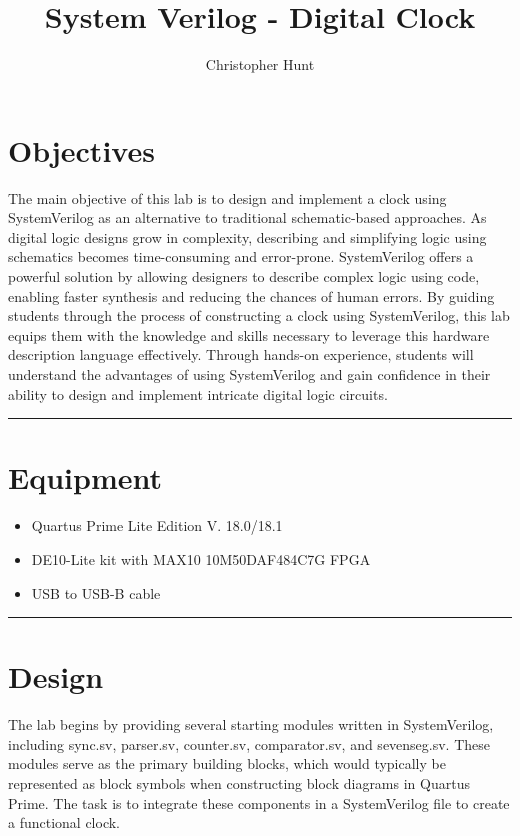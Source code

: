 \documentclass{article}
\title{\textbf{{\huge System Verilog - Digital Clock}}}
\author{Christopher Hunt}
\date{}
\begin{document}
\pagestyle{fancy}
\fancyhf{}
\rhead{\thepage}
\maketitle
\section*{\textcolor{mycolor}{Objectives}}
The main objective of this lab is to design and implement a clock using SystemVerilog as an alternative to traditional schematic-based approaches. As digital logic designs grow in complexity, describing and simplifying logic using schematics becomes time-consuming and error-prone. SystemVerilog offers a powerful solution by allowing designers to describe complex logic using code, enabling faster synthesis and reducing the chances of human errors. By guiding students through the process of constructing a clock using SystemVerilog, this lab equips them with the knowledge and skills necessary to leverage this hardware description language effectively. Through hands-on experience, students will understand the advantages of using SystemVerilog and gain confidence in their ability to design and implement intricate digital logic circuits.
\vspace{5mm}
\hrule

\section*{\textcolor{mycolor}{Equipment}}
\begin{itemize}
  \item Quartus Prime Lite Edition V. 18.0/18.1
  \item DE10-Lite kit with MAX10 10M50DAF484C7G FPGA
  \item USB to USB-B cable
\end{itemize}
\vspace{5mm}
\hrule

\section*{\textcolor{mycolor}{Design}}
The lab begins by providing several starting modules written in SystemVerilog, including sync.sv, parser.sv, counter.sv, comparator.sv, and sevenseg.sv. These modules serve as the primary building blocks, which would typically be represented as block symbols when constructing block diagrams in Quartus Prime. The task is to integrate these components in a SystemVerilog file to create a functional clock.
\end{document}

